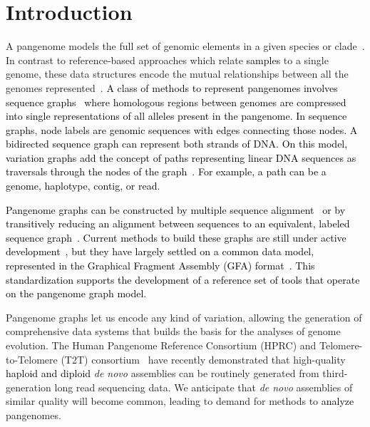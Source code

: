 \documentclass{bioinfo}
\newcommand{\REVIEWED}[1]{{\textcolor{Black}{#1}}}
\begin{document}
\section{Introduction}
A pangenome models the full set of genomic elements in a given species or clade~\REVIEWED{\citep{Tettelin_2008,cpang2018,Eizenga_2020}}.
In contrast to reference-based approaches which relate \REVIEWED{samples} to a single genome, these data structures encode the mutual relationships between all the genomes represented\REVIEWED{~\citep{Ballouz2019}}.
\REVIEWED{A class of methods to represent pangenomes involves sequence graphs~\citep{Hein1989, Paten:2017} where homologous regions between genomes are compressed into single representations of all alleles present in the pangenome.
In sequence graphs, node labels are \REVIEWED{genomic sequences} with edges connecting those nodes.
A bidirected sequence graph can \REVIEWED{represent both strands of DNA}.
On this model, variation graphs add the concept of paths representing linear \REVIEWED{DNA} sequences as traversals through the nodes of the graph~\citep{Garrison:2018}.
\REVIEWED{For example, a} path can be a genome, haplotype, contig, or read.}

\REVIEWED{Pangenome graphs can be constructed by multiple sequence alignment~\citep{Lee_2002,Grasso_2004} or by transitively reducing an alignment between sequences to an equivalent, labeled sequence graph~\citep{Kehr_2014,Garrison_2019_thesis}.
Current methods to build these graphs are still under active development~\citep{Li:2020,Armstrong:2020,pggb}, but they have largely settled on a common data model, represented in the Graphical Fragment Assembly (GFA) format~\citep{GFA}.
This standardization supports the development of a reference set of tools that operate on the pangenome graph model.}

Pangenome graphs let us encode any kind of variation, allowing the generation of comprehensive data systems that builds the basis for the analyses of genome evolution.
The Human Pangenome Reference Consortium (HPRC) and Telomere-to-Telomere (T2T) consortium~\citep{Miga:2020, Logsdon_2021, Nurk_2021, Jarvis2022} have recently demonstrated that high-quality \REVIEWED{haploid and diploid} \textit{de novo} assemblies can be routinely generated from third-generation long read sequencing data.
We anticipate that \textit{de novo} assemblies of similar quality will become common, leading to demand for methods to \REVIEWED{analyze} pangenomes.
\end{document}
